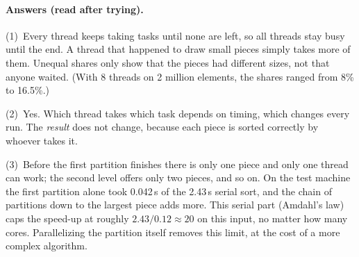 \documentclass[11pt,a4paper]{article}
\begin{document}
\paragraph{Answers (read after trying).}

\noindent(1)~Every thread keeps taking tasks until none are left, so all threads stay busy
until the end. A thread that happened to draw small pieces simply takes more of them.
Unequal shares only show that the pieces had different sizes, not that anyone waited. (With
8 threads on 2 million elements, the shares ranged from 8\% to 16.5\%.)

\noindent(2)~Yes. Which thread takes which task depends on timing, which changes every run.
The \emph{result} does not change, because each piece is sorted correctly by whoever takes
it.

\noindent(3)~Before the first partition finishes there is only one piece and only one thread
can work; the second level offers only two pieces, and so on. On the test machine the first
partition alone took 0.042\,s of the 2.43\,s serial sort, and the chain of partitions down
to the largest piece adds more. This serial part (Amdahl's law) caps the speed-up at roughly
$2.43/0.12\approx20$ on this input, no matter how many cores. Parallelizing the partition
itself removes this limit, at the cost of a more complex algorithm.
\end{document}

